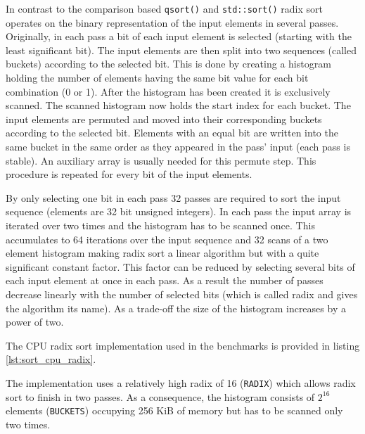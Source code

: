 In contrast to the comparison based \lstinline!qsort()! and \lstinline!std::sort()! radix sort operates on the binary representation of the input elements in several passes. Originally, in each pass a bit of each input element is selected (starting with the least significant bit). The input elements are then split into two sequences (called buckets) according to the selected bit. This is done by creating a histogram holding the number of elements having the same bit value for each bit combination (0 or 1). After the histogram has been created it is exclusively scanned. The scanned histogram now holds the start index for each bucket. The input elements are permuted and moved into their corresponding buckets according to the selected bit. Elements with an equal bit are written into the same bucket in the same order as they appeared in the pass' input (each pass is stable). An auxiliary array is usually needed for this permute step. This procedure is repeated for every bit of the input elements. 

By only selecting one bit in each pass 32 passes are required to sort the input sequence (elements are 32 bit unsigned integers). In each pass the input array is iterated over two times and the histogram has to be scanned once. This accumulates to 64 iterations over the input sequence and 32 scans of a two element histogram making radix sort a linear algorithm but with a quite significant constant factor. This factor can be reduced by selecting several bits of each input element at once in each pass. As a result the number of passes decrease linearly with the number of selected bits (which is called radix and gives the algorithm its name). As a trade-off the size of the histogram increases by a power of two.

The CPU radix sort implementation used in the benchmarks is provided in listing \ref{lst:sort_cpu_radix}.



The implementation uses a relatively high radix of 16 (\lstinline!RADIX!) which allows radix sort to finish in two passes. As a consequence, the histogram consists of $2^{16}$ elements (\lstinline!BUCKETS!) occupying 256 KiB of memory but has to be scanned only two times.

